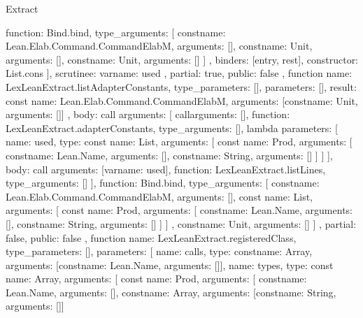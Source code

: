 \begin{lexlean}{Extract}
\begin{toolingmodule}
{{{{{              function: Bind.bind,
              type_arguments: [
                const{name: Lean.Elab.Command.CommandElabM, arguments: []},
                const{name: Unit, arguments: []},
                const{name: Unit, arguments: []}
              ]
            },
            binders: [entry, rest],
            constructor: List.cons
          }
        ],
        scrutinee: var{name: used}
      },
      partial: true,
      public: false
    },
    function{
      name: LexLeanExtract.listAdapterConstants,
      type_parameters: [],
      parameters: [],
      result: const{
        name: Lean.Elab.Command.CommandElabM,
        arguments: [const{name: Unit, arguments: []}]
      },
      body: call{
        arguments: [
          call{arguments: [], function: LexLeanExtract.adapterConstants, type_arguments: []},
          lambda{
            parameters: [
              {
                name: used,
                type: const{
                  name: List,
                  arguments: [
                    const{
                      name: Prod,
                      arguments: [
                        const{name: Lean.Name, arguments: []},
                        const{name: String, arguments: []}
                      ]
                    }
                  ]
                }
              }
            ],
            body: call{
              arguments: [var{name: used}],
              function: LexLeanExtract.listLines,
              type_arguments: []
            }
          }
        ],
        function: Bind.bind,
        type_arguments: [
          const{name: Lean.Elab.Command.CommandElabM, arguments: []},
          const{
            name: List,
            arguments: [
              const{
                name: Prod,
                arguments: [
                  const{name: Lean.Name, arguments: []},
                  const{name: String, arguments: []}
                ]
              }
            ]
          },
          const{name: Unit, arguments: []}
        ]
      },
      partial: false,
      public: false
    },
    function{
      name: LexLeanExtract.registeredClass,
      type_parameters: [],
      parameters: [
        {name: calls, type: const{name: Array, arguments: [const{name: Lean.Name, arguments: []}]}},
        {
          name: types,
          type: const{
            name: Array,
            arguments: [
              const{
                name: Prod,
                arguments: [
                  const{name: Lean.Name, arguments: []},
                  const{name: Array, arguments: [const{name: String, arguments: []}]}
}}}}}
\end{toolingmodule}
\end{lexlean}
